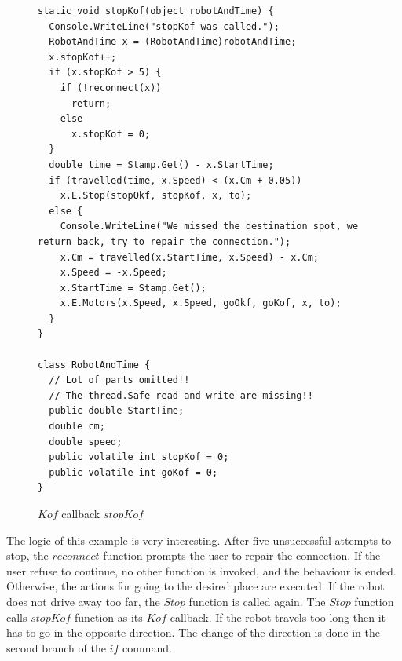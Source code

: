 \begin{figure}[!hbp]
\begin{lstlisting}
static void stopKof(object robotAndTime) {
  Console.WriteLine("stopKof was called.");
  RobotAndTime x = (RobotAndTime)robotAndTime;
  x.stopKof++;
  if (x.stopKof > 5) {
    if (!reconnect(x))
      return;
    else
      x.stopKof = 0;
  }
  double time = Stamp.Get() - x.StartTime;
  if (travelled(time, x.Speed) < (x.Cm + 0.05))
    x.E.Stop(stopOkf, stopKof, x, to);
  else {
    Console.WriteLine("We missed the destination spot, we return back, try to repair the connection.");
    x.Cm = travelled(x.StartTime, x.Speed) - x.Cm;
    x.Speed = -x.Speed;
    x.StartTime = Stamp.Get();
    x.E.Motors(x.Speed, x.Speed, goOkf, goKof, x, to);
  }
}

class RobotAndTime {
  // Lot of parts omitted!! 
  // The thread.Safe read and write are missing!!
  public double StartTime;
  double cm;
  double speed;
  public volatile int stopKof = 0;
  public volatile int goKof = 0;
}
\end{lstlisting}
\caption{$Kof$ callback $stopKof$} \label{stopKof}
\end{figure}
  The logic of this example is very interesting. After five unsuccessful attempts to stop,
  the $reconnect$ function prompts the user to repair the connection. 
  If the user refuse to continue, no other function is invoked, and the behaviour is ended.
  Otherwise, the actions for going to the desired place are executed.
  If the robot does not drive away too far, the $Stop$ function is called again.
  The $Stop$ function calls $stopKof$ function as its $Kof$ callback.
  If the robot travels too long then it has to go in the opposite direction.
  The change of the direction is done in the second branch of the $if$ command.

